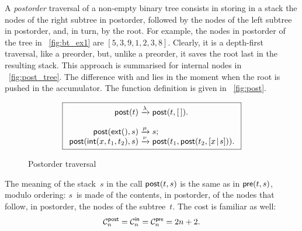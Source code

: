A \emph{postorder} traversal of a
non\hyp{}empty binary tree consists in storing in a stack the nodes of
the right subtree in postorder, followed by the nodes of the left
subtree in postorder, and, in turn, by the root. For example, the
nodes in postorder of the tree in \fig~\vref{fig:bt_ex1} are
\([5,3,9,1,2,3,8]\). Clearly, it is a depth\hyp{}first
traversal, like a preorder,
but, unlike a preorder, it saves the root last in the resulting
stack. This approach is summarised for internal nodes in
\fig~\vref{fig:post_tree}. The difference with
 and 
lies in the moment when the root is pushed in the accumulator. The
function definition is given in \fig~\vref{fig:post}.
\begin{figure}
\begin{equation*}
\boxed{
\begin{array}{r@{\;}c@{\;}l}
\fun{post}(t) & \xrightarrow{\lambda} & \fun{post}(t,\el).\\
\\
\fun{post}(\fun{ext}(),s) & \xrightarrow{\smash{\mu}} & s;\\
\fun{post}(\fun{int}(x,t_1,t_2),s)
  & \xrightarrow{\smash{\nu}}
  & \fun{post}(t_1,\fun{post}(t_2,\cons{x}{s})).
\end{array}}
\end{equation*}
\caption{Postorder traversal}
\label{fig:post}
\end{figure}
The meaning of the stack~\(s\) in the call
\(\textsf{post}(t,s)\)
is the same as in \(\textsf{pre}(t,s)\), modulo ordering: \(s\)~is made
of the contents, in postorder, of the nodes that follow, in postorder,
the nodes of the subtree~\(t\). The cost is familiar as well:
\begin{equation*}
  \C{\fun{post}}{n} = \C{\fun{in}}{n} = \C{\fun{pre}}{n} = 2n + 2.
  \index{post@$\C{\fun{post}}{n}$}
\end{equation*}

